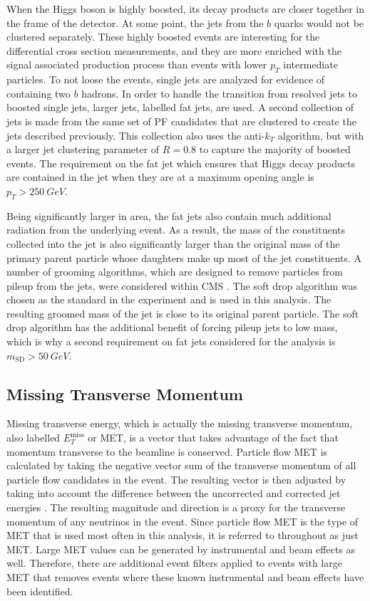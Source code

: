 When the Higgs boson is highly boosted, its decay products are closer together
in the frame of the detector.
At some point, the jets from the $b$ quarks would not be clustered separately.
These highly boosted events are interesting for the differential cross section measurements,
and they are more enriched with the signal associated production process than
events with lower $p_T$ intermediate particles.
To not loose the events, single jets are analyzed for evidence of containing two $b$ hadrons.
In order to handle the transition from resolved jets to boosted single jets,
larger jets, labelled fat jets, are used.
A second collection of jets is made from the same set of PF candidates that are
clustered to create the jets described previously.
This collection also uses the anti-$k_T$ algorithm,
but with a larger jet clustering parameter of $R = 0.8$ to capture the majority of boosted events.
The requirement on the fat jet which ensures that Higgs decay products are contained
in the jet when they are at a maximum opening angle is $p_T > \SI{250}{GeV}$.

Being significantly larger in area,
the fat jets also contain much additional radiation from the underlying event.
As a result, the mass of the constituents collected into the jet
is also significantly larger than the original mass of the primary parent particle
whose daughters make up most of the jet constituents.
A number of grooming algorithms,
which are designed to remove particles from pileup from the jets,
were considered within CMS \cite{dabercro2014}.
The soft drop algorithm \cite{Larkoski_2014} was chosen as the standard in the experiment
and is used in this analysis.
The resulting groomed mass of the jet is close to its original parent particle.
The soft drop algorithm has the additional benefit of forcing pileup jets to low mass,
which is why a second requirement on fat jets considered for the analysis is
$m_\mathrm{SD} > \SI{50}{GeV}$.

\subsection{Missing Transverse Momentum}

Missing transverse energy, which is actually the missing transverse momentum,
also labelled $E_T^\mathrm{miss}$ or MET,
is a vector that takes advantage of the fact that momentum
transverse to the beamline is conserved.
Particle flow MET is calculated by taking the negative vector sum of the
transverse momentum of all particle flow candidates in the event.
The resulting vector is then adjusted by taking into account the difference
between the uncorrected and corrected jet energies \cite{collaboration_2015}.
The resulting magnitude and direction is a proxy for the transverse momentum of
any neutrinos in the event.
Since particle flow MET is the type of MET that is used most often in this analysis,
it is referred to throughout as just MET.
Large MET values can be generated by instrumental and beam effects as well.
Therefore, there are additional event filters applied to events with large MET
that removes events where these known instrumental and beam effects have been identified.

